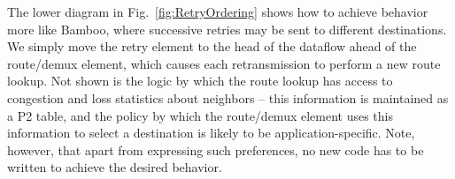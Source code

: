 \documentclass[10pt,twocolumn]{article}
\begin{document}
The lower diagram in Fig.~\ref{fig:RetryOrdering} shows how to
achieve behavior more like Bamboo, where successive retries may be
sent to different destinations. We simply move the retry element to
the head of the dataflow ahead of the route/demux element, which causes
each retransmission to perform a new route lookup.  Not shown is the
logic by which the route lookup has access to congestion and loss
statistics about neighbors -- this information is maintained as a P2
table, and the policy by which the route/demux element uses this
information to select a destination is likely to be
application-specific.  Note, however, that apart from expressing such 
preferences, no new code has to be written to achieve the desired behavior. 


\end{document}
